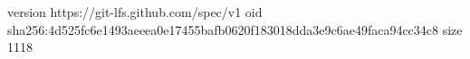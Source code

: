 version https://git-lfs.github.com/spec/v1
oid sha256:4d525fc6e1493aeeea0e17455bafb0620f183018dda3e9c6ae49faca94cc34c8
size 1118
